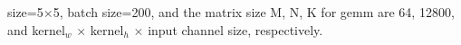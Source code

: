 \documentclass[10pt,twocolumn,letterpaper]{article}
\newcommand{\architecture}[1]{\emph{#1}}
\begin{document}
size=5$\times$5, batch size=200, and the matrix size M, N, K for gemm are 64, 12800, and kernel$_{w}$ $\times$ kernel$_{h}$ $\times$ input channel size, respectively.%
\end{document}
